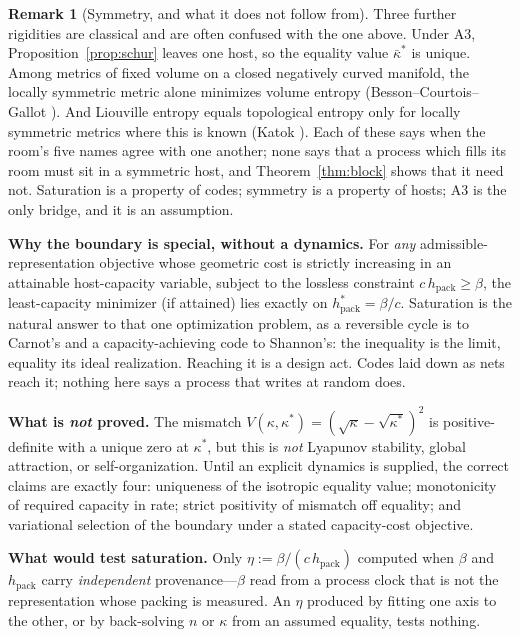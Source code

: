 \documentclass[11pt,reqno]{amsart}
\theoremstyle{plain}
\theoremstyle{definition}
\newtheorem{remark}[theorem]{Remark}
\newcommand{\hpack}{h_{\mathrm{pack}}}
\begin{document}
\begin{remark}[Symmetry, and what it does not follow from]\label{rem:symmetry}
Three further rigidities are classical and are often confused with the one above. Under A3, Proposition~\ref{prop:schur} leaves one host, so the equality value $\bar\kappa^*$ is unique. Among metrics of fixed volume on a closed negatively curved manifold, the locally symmetric metric alone minimizes volume entropy (Besson--Courtois--Gallot \cite{bcg1995}). And Liouville entropy equals topological entropy only for locally symmetric metrics where this is known (Katok \cite{katok1982}). Each of these says when the room's five names agree with one another; none says that a process which fills its room must sit in a symmetric host, and Theorem~\ref{thm:block} shows that it need not. Saturation is a property of codes; symmetry is a property of hosts; A3 is the only bridge, and it is an assumption.
\end{remark}

\noindent\textbf{Why the boundary is special, without a dynamics.} For \emph{any} admissible-representation objective whose geometric cost is strictly increasing in an attainable host-capacity variable, subject to the lossless constraint $c\,\hpack\ge\beta$, the least-capacity minimizer (if attained) lies exactly on $\hpack^*=\beta/c$. Saturation is the natural answer to that one optimization problem, as a reversible cycle is to Carnot's and a capacity-achieving code to Shannon's: the inequality is the limit, equality its ideal realization. Reaching it is a design act. Codes laid down as nets reach it; nothing here says a process that writes at random does.

\medskip
\noindent\textbf{What is \emph{not} proved.} The mismatch $V(\kappa,\kappa^*)=(\sqrt\kappa-\sqrt{\kappa^*})^2$ is positive-definite with a unique zero at $\kappa^*$, but this is \emph{not} Lyapunov stability, global attraction, or self-organization. Until an explicit dynamics is supplied, the correct claims are exactly four: uniqueness of the isotropic equality value; monotonicity of required capacity in rate; strict positivity of mismatch off equality; and variational selection of the boundary under a stated capacity-cost objective.

\medskip
\noindent\textbf{What would test saturation.} Only $\eta:=\beta/(c\,\hpack)$ computed when $\beta$ and $\hpack$ carry \emph{independent} provenance---$\beta$ read from a process clock that is not the representation whose packing is measured. An $\eta$ produced by fitting one axis to the other, or by back-solving $n$ or $\kappa$ from an assumed equality, tests nothing.
\end{document}
